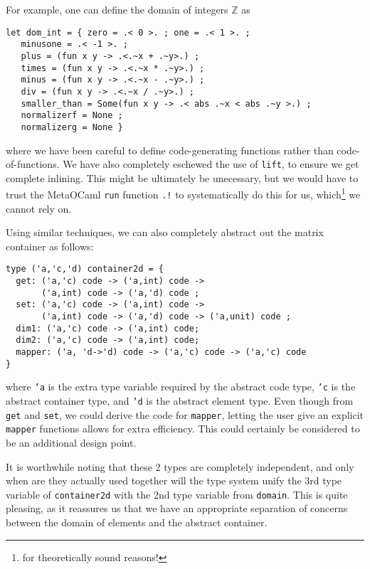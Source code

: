 \documentclass[11pt]{elsart}
\begin{document}
For example, one can define the domain of integers $\mathbb{Z}$ as
\begin{small}
\begin{verbatim}
let dom_int = { zero = .< 0 >. ; one = .< 1 >. ;
   minusone = .< -1 >. ;
   plus = (fun x y -> .<.~x + .~y>.) ;
   times = (fun x y -> .<.~x * .~y>.) ;
   minus = (fun x y -> .<.~x - .~y>.) ;
   div = (fun x y -> .<.~x / .~y>.) ;
   smaller_than = Some(fun x y -> .< abs .~x < abs .~y >.) ;
   normalizerf = None ;
   normalizerg = None }
\end{verbatim}
\end{small}
\noindent where we have been careful to define code-generating
functions rather than code-of-functions.  We have also completely
eschewed the use of \texttt{lift}, to ensure we get complete
inlining.  This might be ultimately be unecessary, but we would have 
to trust the MetaOCaml \texttt{run} function \texttt{.!} to 
systematically do this for us, which\footnote{for theoretically sound 
reasons!} we cannot rely on.

Using similar techniques, we can also completely abstract out
the matrix container as follows:
\begin{small}
\begin{verbatim}
type ('a,'c,'d) container2d = {
  get: ('a,'c) code -> ('a,int) code -> 
       ('a,int) code -> ('a,'d) code ;
  set: ('a,'c) code -> ('a,int) code -> 
       ('a,int) code -> ('a,'d) code -> ('a,unit) code ;
  dim1: ('a,'c) code -> ('a,int) code;
  dim2: ('a,'c) code -> ('a,int) code;
  mapper: ('a, 'd->'d) code -> ('a,'c) code -> ('a,'c) code
} 
\end{verbatim}
\end{small}
\noindent where \texttt{'a} is the extra type variable required by the
abstract code type, \texttt{'c} is the abstract container type, and
\texttt{'d} is the abstract element type.  Even though from 
\texttt{get} and \texttt{set}, we could derive the code for \texttt{mapper},
letting the user give an explicit \texttt{mapper} functions allows for
extra efficiency.  This could certainly be considered to be an
additional design point.

It is worthwhile noting that these 2 types are completely independent, 
and only when are they actually used together will the type system
unify the 3rd type variable of \texttt{container2d}
with the 2nd type variable from \texttt{domain}.  This is quite pleasing,
as it reassures us that we have an appropriate separation of concerns
between the domain of elements and the abstract container.
\end{document}

